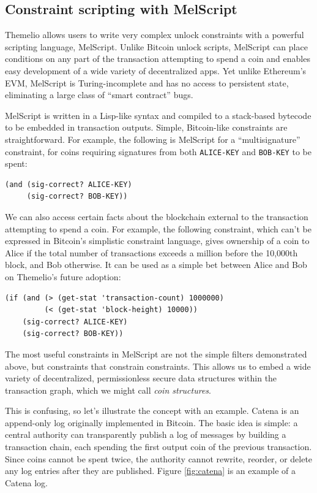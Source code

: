 \documentclass[headinclude]{scrbook}
\begin{document}
\subsection{Constraint scripting with MelScript} \label{ss:melscript}

Themelio allows users to write very complex unlock constraints with a powerful scripting language, MelScript. Unlike Bitcoin unlock scripts, MelScript can place conditions on any part of the transaction attempting to spend a coin and enables easy development of a wide variety of decentralized apps. Yet unlike Ethereum's EVM, MelScript is Turing-incomplete and has no access to persistent state, eliminating a large class of ``smart contract'' bugs.

MelScript is written in a Lisp-like syntax and compiled to a stack-based bytecode to be embedded in transaction outputs. Simple, Bitcoin-like constraints are straightforward. For example, the following is MelScript for a ``multisignature'' constraint, for coins requiring signatures from both \texttt{ALICE-KEY} and \texttt{BOB-KEY} to be spent:
\begin{lstlisting}
(and (sig-correct? ALICE-KEY)
     (sig-correct? BOB-KEY))
\end{lstlisting}

We can also access certain facts about the blockchain external to the transaction attempting to spend a coin. For example, the following constraint, which can't be expressed in Bitcoin's simplistic constraint language, gives ownership of a coin to Alice if the total number of transactions exceeds a million before the 10,000th block, and Bob otherwise. It can be used as a simple bet between Alice and Bob on Themelio's future adoption:
\begin{lstlisting}
(if (and (> (get-stat 'transaction-count) 1000000)
         (< (get-stat 'block-height) 10000))
    (sig-correct? ALICE-KEY)
    (sig-correct? BOB-KEY))
\end{lstlisting}

The most useful constraints in MelScript are not the simple filters demonstrated above, but constraints that constrain constraints. This allows us to embed a wide variety of decentralized, permissionless secure data structures within the transaction graph, which we might call \emph{coin structures}.

This is confusing, so let's illustrate the concept with an example. Catena \cite{tomescu2017catena} is an append-only log originally implemented in Bitcoin. The basic idea is simple: a central authority can transparently publish a log of messages by building a transaction chain, each spending the first output coin of the previous transaction. Since coins cannot be spent twice, the authority cannot rewrite, reorder, or delete any log entries after they are published. Figure \ref{fig:catena} is an example of a Catena log.
\end{document}
